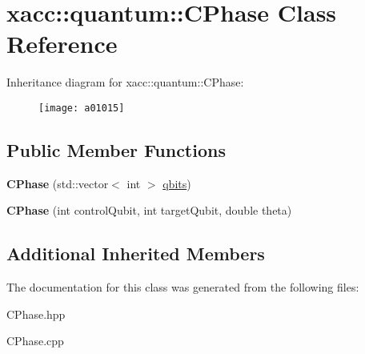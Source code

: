 \hypertarget{a01015}{}\section{xacc\+:\+:quantum\+:\+:C\+Phase Class Reference}
\label{a01015}
Inheritance diagram for xacc\+:\+:quantum\+:\+:C\+Phase\+:\begin{figure}[H]
\begin{center}
\leavevmode
\texttt{[image: a01015]}
\end{center}
\end{figure}
\subsection*{Public Member Functions}
\begin{DoxyCompactItemize}
\item 
\mbox{\label{a01015_a5899f838bc4b892d179f51fcf0ac4cc8}} 
{\bfseries C\+Phase} (std\+::vector$<$ int $>$ \hyperlink{a00991_a2a56be6c2519ea65df4d06f4abae1393}{qbits})
\item 
\mbox{\label{a01015_af642f499455f0065279a1e1d178c818f}} 
{\bfseries C\+Phase} (int control\+Qubit, int target\+Qubit, double theta)
\end{DoxyCompactItemize}
\subsection*{Additional Inherited Members}


The documentation for this class was generated from the following files\+:\begin{DoxyCompactItemize}
\item 
C\+Phase.\+hpp\item 
C\+Phase.\+cpp\end{DoxyCompactItemize}

